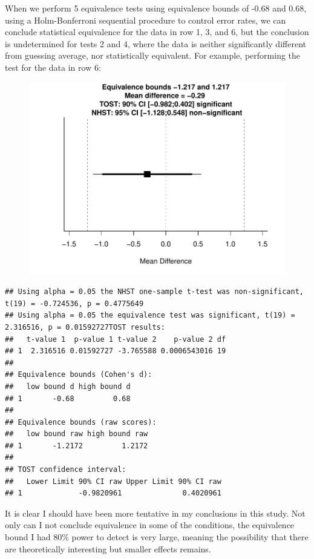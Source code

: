 \documentclass[english,man]{apa6}
\theoremstyle{definition}
\theoremstyle{definition}
\theoremstyle{definition}
\theoremstyle{remark}
\begin{document}
When we perform 5 equivalence tests using equivalence bounds of -0.68
and 0.68, using a Holm-Bonferroni sequential procedure to control error
rates, we can conclude statistical equivalence for the data in row 1, 3,
and 6, but the conclusion is undetermined for tests 2 and 4, where the
data is neither significantly different from guessing average, nor
statistically equivalent. For example, performing the test for the data
in row 6:

\begin{figure}[htbp]
\centering
\includegraphics{manuscript_files/figure-latex/unnamed-chunk-9-1.pdf}
\caption{}
\end{figure}

\begin{verbatim}
## Using alpha = 0.05 the NHST one-sample t-test was non-significant, t(19) = -0.724536, p = 0.4775649
## Using alpha = 0.05 the equivalence test was significant, t(19) = 2.316516, p = 0.01592727TOST results:
##   t-value 1  p-value 1 t-value 2    p-value 2 df
## 1  2.316516 0.01592727 -3.765588 0.0006543016 19
## 
## Equivalence bounds (Cohen's d):
##   low bound d high bound d
## 1       -0.68         0.68
## 
## Equivalence bounds (raw scores):
##   low bound raw high bound raw
## 1       -1.2172         1.2172
## 
## TOST confidence interval:
##   Lower Limit 90% CI raw Upper Limit 90% CI raw
## 1             -0.9820961              0.4020961
\end{verbatim}

It is clear I should have been more tentative in my conclusions in this
study. Not only can I not conclude equivalence in some of the
conditions, the equivalence bound I had 80\% power to detect is very
large, meaning the possibility that there are theoretically interesting
but smaller effects remains.
\end{document}
